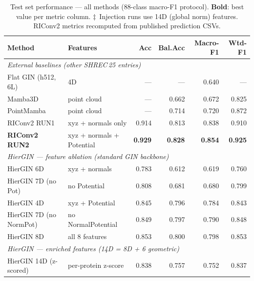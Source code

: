 \begin{table}[ht]
  \centering
  \caption{Test set performance --- all methods (88-class macro-F1 protocol).
           \textbf{Bold}: best value per metric column.
           $\ddagger$~Injection runs use 14D (global norm) features.
           RIConv2 metrics recomputed from published prediction CSVs.}
  \label{tab:main_results}
  \setlength{\tabcolsep}{4.5pt}
  \begin{tabular}{llrrrr}
    \toprule
    \textbf{Method} & \textbf{Features}
      & \textbf{Acc} & \textbf{Bal.Acc} & \textbf{Macro-F1} & \textbf{Wtd-F1} \\
    \midrule
    \multicolumn{6}{l}{\textit{External baselines (other SHREC\,25 entries)}} \\
    \quad Flat GIN (h512, 6L)         & 4D                  & ---   & ---   & 0.640 & ---   \\
    \quad Mamba3D~\cite{mamba3d}      & point cloud         & ---   & 0.662 & 0.672 & 0.825 \\
    \quad PointMamba~\cite{pointmamba}& point cloud         & ---   & 0.714 & 0.720 & 0.872 \\
    \quad RIConv2 RUN1~\cite{riconv2} & xyz + normals only  & 0.914 & 0.813 & 0.838 & 0.910 \\
    \quad \textbf{RIConv2 RUN2}~\cite{riconv2} & xyz + normals + Potential & \textbf{0.929} & \textbf{0.828} & \textbf{0.854} & \textbf{0.925} \\
    \midrule
    \multicolumn{6}{l}{\textit{HierGIN --- feature ablation (standard GIN backbone)}} \\
    \quad HierGIN 6D                  & xyz + normals        & 0.783 & 0.612 & 0.619 & 0.760 \\
    \quad HierGIN 7D (no Pot)         & no Potential         & 0.808 & 0.681 & 0.680 & 0.799 \\
    \quad HierGIN 4D                  & xyz + Potential      & 0.845 & 0.796 & 0.784 & 0.843 \\
    \quad HierGIN 7D (no NormPot)     & no NormalPotential   & 0.849 & 0.797 & 0.790 & 0.848 \\
    \quad HierGIN 8D                  & all 8 features       & 0.853 & 0.800 & 0.798 & 0.853 \\
    \midrule
    \multicolumn{6}{l}{\textit{HierGIN --- enriched features (14D = 8D + 6 geometric)}} \\
    \quad HierGIN 14D (z-scored)      & per-protein z-score  & 0.838 & 0.757 & 0.752 & 0.837 \\

\end{tabular}
\end{table}
